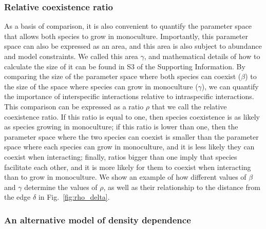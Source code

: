 \subsubsection{Relative coexistence ratio}

As a basis of comparison, it is also convenient to quantify the parameter space that allows both species to grow in monoculture. Importantly, this parameter space can also be expressed as an area, and this area is also subject to abundance and model constraints. We called this area $\gamma$, and mathematical details of how to calculate the size of it can be found in S3 of the Supporting Information. By comparing the size of the parameter space where both species can coexist ($\beta$) to the size of the space where species can grow in monoculture ($\gamma$), we can quantify the importance of interspecific interactions relative to intraspecific interactions. This comparison can be expressed as a ratio $\rho$ that we call the relative coexistence ratio. If this ratio is equal to one, then species coexistence is as likely as species growing in monoculture; if this ratio is lower than one, then the parameter space where the two species can coexist is smaller than the parameter space where each species can grow in monoculture,  and it is less likely they can coexist when interacting; finally, ratios bigger than one imply that species facilitate each other, and it is more likely for them to coexist when interacting than to grow in monoculture. We show an example of how different values of $\beta$ and $\gamma$ determine the values of $\rho$, as well as their relationship to the distance from the edge $\delta$ in Fig.~\ref{fig:rho_delta}.

\subsubsection{An alternative model of density dependence}


